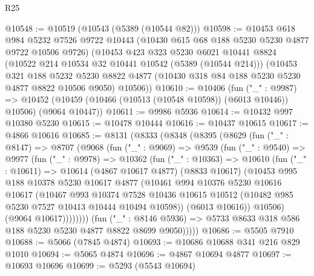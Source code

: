 \begin{lexlean}{R25}
\begin{coremodule}
@10548 := @10519 (@10543 (@5389 (@10544 @82)))
@10598 := @10453
    @618
    @984
    @5232
    @7526
    @9722
    @10443
    (@10430 @615 @68 @188 @5230 @5230 @4877 @9722 @10506 @9726)
    (@10453
      @423
      @323
      @5230
      @6021
      @10441
      @8824
      (@10522 @214 @10534 @32 @10441 @10542 (@5389 (@10544 @214)))
      (@10453
        @321
        @188
        @5232
        @5230
        @8822
        @4877
        (@10430 @318 @84 @188 @5230 @5230 @4877 @8822 @10506 @9050)
        @10506))
@10610 := @10406
    (fun ("_" : @9987) =>
    @10452 (@10459 (@10466 (@10513 (@10548 @10598)) (@6013 @10446)) @10506) (@9064 @10447))
@10611 := @9986 @5936
@10614 := @10432 @997 @10380 @5230
@10615 := @10478 @10444
@10616 := @10437 @10615
@10617 := @4866 @10616
@10685 := @8131
    (@8333
      (@8348
        (@8395
          (@8629
            (fun ("_" : @8147) =>
            @8707
              (@9068
                (fun ("_" : @9069) =>
                @9539
                  (fun ("_" : @9540) =>
                  @9977
                    (fun ("_" : @9978) =>
                    @10362
                      (fun ("_" : @10363) =>
                      @10610
                        (fun ("_" : @10611) =>
                        @10614
                          (@4867 @10617 @4877)
                          (@8833 @10617)
                          (@10453
                            @995
                            @188
                            @10378
                            @5230
                            @10617
                            @4877
                            (@10461
                              @994
                              @10376
                              @5230
                              @10616
                              @10617
                              (@10467
                                @993
                                @10374
                                @7528
                                @10436
                                @10615
                                @10512
                                (@10482 @985 @5230 @7527 @10413 @10444 @10494 @10598))
                              (@6013 @10616))
                            @10506)
                          (@9064 @10617))))))))
            (fun ("_" : @8146 @5936) =>
            @5733 @8633 @318 @586 @188 @5230 @5230 @4877 @8822 @8699 @9050)))))
@10686 := @5505 @7910
@10688 := @5066 (@7845 @4874)
@10693 := @10686 @10688 @341 @216 @829 @1010
@10694 := @5065 @4874
@10696 := @4867 @10694 @4877
@10697 := @10693 @10696
@10699 := @5293 (@5543 @10694)

\end{coremodule}
\end{lexlean}
